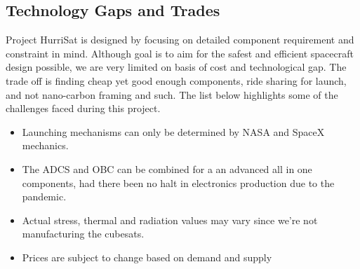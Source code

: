 \subsection{Technology Gaps and Trades}

Project HurriSat is designed by focusing on detailed component requirement and constraint in mind. Although goal is to aim for the safest and efficient spacecraft design possible, we are very limited on basis of cost and technological gap. The trade off is finding cheap yet good enough components, ride sharing for launch, and not nano-carbon framing and such. The list below highlights some of the challenges faced during this project.

\begin{itemize}[noitemsep]
  \item 
  Launching mechanisms can only be determined by NASA and SpaceX mechanics. 
  \item 
  The ADCS and OBC can be combined for a an advanced all in one components, had there been no halt in electronics production due to the pandemic. 
    \item 
    Actual stress, thermal and radiation  values may vary since we’re not manufacturing the cubesats. 
  \item 
  Prices are subject to change based on demand and supply
\end{itemize}
